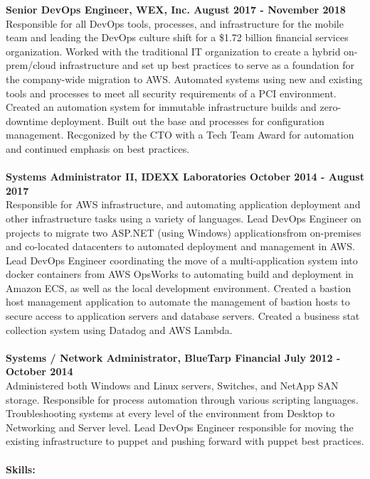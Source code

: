 \documentclass[10pt]{article}
\begin{document}
\textbf{Senior DevOps Engineer, WEX, Inc. \hfill{August 2017 - November 2018}}\\
\normalsize Responsible for all DevOps tools, processes, and infrastructure for the mobile team and leading the DevOps culture shift for a \$1.72 billion 
financial services organization. Worked with the traditional IT organization to create a hybrid on-prem/cloud infrastructure and set up best practices to serve 
as a foundation for the company-wide migration to AWS. Automated systems using new and existing tools and processes to meet all security requirements of a PCI environment. 
Created an automation system for immutable infrastructure builds and zero-downtime deployment. Built out the base and processes for configuration management. 
Recgonized by the CTO with a Tech Team Award for automation and continued emphasis on best practices.
\\
\\
\textbf{Systems Administrator II, IDEXX Laboratories \hfill{October 2014 - August 2017}}\\
\normalsize Responsible for AWS infrastructure, and automating application deployment and other infrastructure tasks using a variety of languages. Lead 
DevOps Engineer on projects to migrate two ASP.NET (using Windows) applicationsfrom on-premises and co-located datacenters to automated 
deployment and management in AWS. Lead DevOps Engineer coordinating the move of a  multi-application system into docker containers from AWS OpsWorks to automating 
build and deployment in Amazon ECS, as well as the local development environment. Created a bastion host management application to automate the 
management of bastion hosts to secure access to application servers and database servers. Created a business stat collection system using Datadog and AWS Lambda.
\\
\\
\textbf{Systems / Network Administrator, BlueTarp Financial \hfill{July 2012 - October 2014}}\\
\normalsize Administered both Windows and Linux servers, Switches, and NetApp SAN storage. Responsible for process automation through various scripting languages. Troubleshooting systems at every level of the
environment from Desktop to Networking and Server level. Lead DevOps Engineer responsible for moving the existing infrastructure to puppet and pushing forward with puppet best practices.
\\
\\
\noindent\Large\textbf{Skills:}\\
\end{document}
